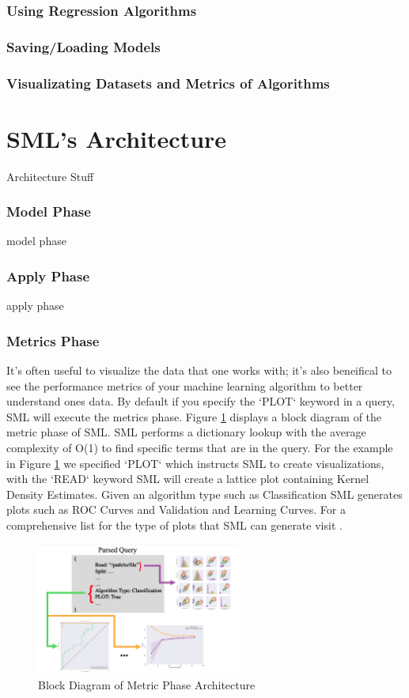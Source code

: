 \documentclass[jair,twoside,11pt,theapa]{article}
\begin{document}
\subsubsection{Using Regression Algorithms}

\subsubsection{Saving/Loading Models}

\subsubsection{Visualizating Datasets and Metrics of Algorithms}

\section{SML's Architecture}
\label{sml-architecture}

Architecture Stuff

\subsubsection{Model Phase}
model phase
\subsubsection{Apply Phase}
apply phase
\subsubsection{Metrics Phase}
It's often useful to visualize the data that one works with; it's also beneifical to see the performance metrics of your machine learning algorithm to better understand ones data. By default if you specify the `PLOT` keyword in a query, SML will execute the metrics phase. Figure \ref{fig:metric-phase} displays a block diagram of the metric phase of SML. SML performs a dictionary lookup with the average complexity of O(1) to find specific terms that are in the query. For the example in Figure \ref{fig:metric-phase} we specified `PLOT` which instructs SML to create visualizations, with the `READ` keyword SML will create a lattice plot containing Kernel Density Estimates. Given an algorithm type such as Classification SML generates plots such as ROC Curves and Validation and Learning Curves. For a comprehensive list for the type of plots that SML can generate visit  \cite{}.

\begin{figure}
\includegraphics[width=0.6\textwidth]{figs/metric-phase.png}
\centering
\caption{Block Diagram of Metric Phase Architecture}
\label{fig:metric-phase}
\end{figure}
\end{document}
